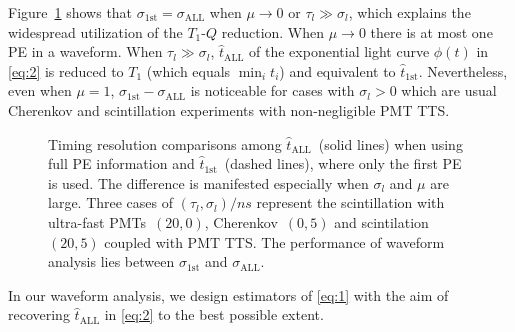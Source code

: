 Figure~\ref{fig:reso-diff} shows that $\sigma_{\mathrm{1st}}=\sigma_{\mathrm{ALL}}$ when $\mu \to 0$ or $\tau_l \gg \sigma_l$, which explains the widespread utilization of the $T_1$-$Q$ reduction. When $\mu \to 0$ there is at most one PE in a waveform. When $\tau_l \gg \sigma_l$, $\hat{t}_\mathrm{ALL}$ of the exponential light curve $\phi(t)$ in \eqref{eq:2} is reduced to $T_1$ (which equals $\min_i t_i$) and equivalent to $\hat{t}_\mathrm{1st}$. Nevertheless, even when $\mu = 1$, $\sigma_{\mathrm{1st}} - \sigma_{\mathrm{ALL}}$ is noticeable for cases with $\sigma_l > 0$ which are usual Cherenkov and scintillation experiments with non-negligible PMT TTS. 
\begin{figure}[H]
  \centering
  \resizebox{0.8\textwidth}{!}{}
  \caption{\label{fig:reso-diff} Timing resolution comparisons among $\hat{t}_{\mathrm{ALL}}$~(solid lines) when using full PE information and $\hat{t}_\mathrm{1st}$~(dashed lines), where only the first PE is used. The difference is manifested especially when $\sigma_l$ and $\mu$ are large. Three cases of $(\tau_l, \sigma_l)/\si{ns}$ represent the scintillation with ultra-fast PMTs~$(20,0)$, Cherenkov~$(0, 5)$ and scintilation~$(20, 5)$ coupled with PMT TTS. The performance of waveform analysis lies between $\sigma_{\mathrm{1st}}$ and $\sigma_{\mathrm{ALL}}$. }
\end{figure}

In our waveform analysis, we design estimators of \eqref{eq:1} with the aim of recovering $\hat{t}_\mathrm{ALL}$ in \eqref{eq:2} to the best possible extent. 
